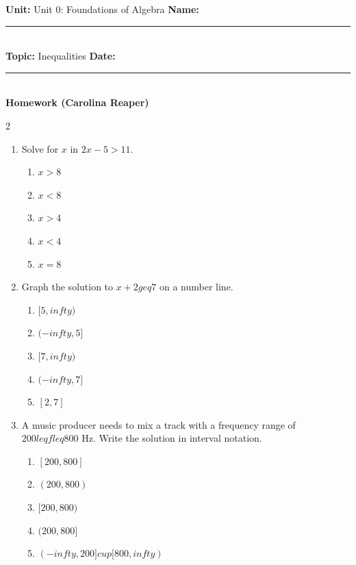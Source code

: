 \documentclass[10pt]{article}
\begin{document}
\enlargethispage{2.5cm}

\begin{tcolorbox}[colback=mainblue!5, colframe=mainblue, sharp corners, boxrule=0.5pt]
    \small \textbf{Unit:} Unit 0: Foundations of Algebra \hfill \textbf{Name:} \rule{3cm}{0.4pt} \\
    \small \textbf{Topic:} Inequalities \hfill \textbf{Date:} \rule{2cm}{0.4pt} \\
    \centering \textbf{\large Homework (Carolina Reaper)}
\end{tcolorbox}

\vspace{0.2cm}

\begin{multicols}{2}
\begin{enumerate}[label=\textbf{Q\arabic*.}, leftmargin=*, itemsep=6pt, parsep=0pt]

  \item \small Solve for $x$ in $2x - 5 > 11$.
  \begin{enumerate}[label=(\Alph*), leftmargin=0.6cm, nosep, itemsep=2pt]
    \item $x > 8$
    \item $x < 8$
    \item $x > 4$
    \item $x < 4$
    \item $x = 8$
  \end{enumerate}

  \item \small Graph the solution to $x + 2 geq 7$ on a number line.
  \begin{enumerate}[label=(\Alph*), leftmargin=0.6cm, nosep, itemsep=2pt]
    \item $[5, infty)$
    \item $(-infty, 5]$
    \item $[7, infty)$
    \item $(-infty, 7]$
    \item $[2, 7]$
  \end{enumerate}

  \item \small A music producer needs to mix a track with a frequency range of $200 leq f leq 800$ Hz. Write the solution in interval notation.
  \begin{enumerate}[label=(\Alph*), leftmargin=0.6cm, nosep, itemsep=2pt]
    \item $[200, 800]$
    \item $(200, 800)$
    \item $[200, 800)$
    \item $(200, 800]$
    \item $(-infty, 200] cup [800, infty)$
  \end{enumerate}


\end{enumerate}
\end{multicols}
\end{document}
